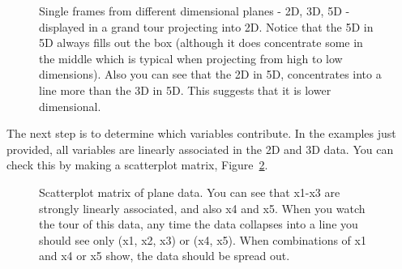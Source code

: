 \documentclass[
  letterpaper,
]{krantz}
\begin{document}
\begin{figure}
\begin{minipage}{0.33\linewidth}
{}


\end{minipage}%

\caption{\label{fig-dimension-pdf}Single frames from different
dimensional planes - 2D, 3D, 5D - displayed in a grand tour projecting
into 2D. Notice that the 5D in 5D always fills out the box (although it
does concentrate some in the middle which is typical when projecting
from high to low dimensions). Also you can see that the 2D in 5D,
concentrates into a line more than the 3D in 5D. This suggests that it
is lower dimensional. }

\end{figure}%

The next step is to determine which variables contribute. In the
examples just provided, all variables are linearly associated in the 2D
and 3D data. You can check this by making a scatterplot matrix,
Figure~\ref{fig-plane-scatmat}.

\begin{figure}


\caption{\label{fig-plane-scatmat}Scatterplot matrix of plane data. You
can see that x1-x3 are strongly linearly associated, and also x4 and x5.
When you watch the tour of this data, any time the data collapses into a
line you should see only (x1, x2, x3) or (x4, x5). When combinations of
x1 and x4 or x5 show, the data should be spread out.}

\end{figure}%
\end{document}
